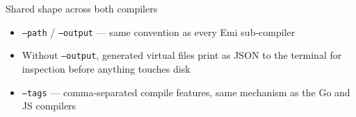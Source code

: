\begin{sidebar}{Shared shape across both compilers}
\begin{itemize}[leftmargin=1.1em,itemsep=1pt,topsep=2pt]
  \item \texttt{--path} / \texttt{--output} --- same convention as every
        Emi sub-compiler
  \item Without \texttt{--output}, generated virtual files print as JSON
        to the terminal for inspection before anything touches disk
  \item \texttt{--tags} --- comma-separated compile features, same
        mechanism as the Go and JS compilers
\end{itemize}
\end{sidebar}
